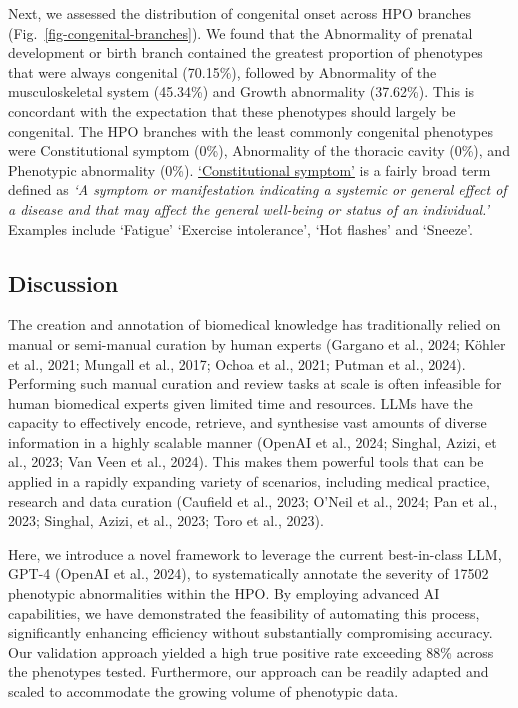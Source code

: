 \documentclass[
]{agujournal2019}
\begin{document}
Next, we assessed the distribution of congenital onset across HPO
branches (Fig.~\ref{fig-congenital-branches}). We found that the
Abnormality of prenatal development or birth branch contained the
greatest proportion of phenotypes that were always congenital (70.15\%),
followed by Abnormality of the musculoskeletal system (45.34\%) and
Growth abnormality (37.62\%). This is concordant with the expectation
that these phenotypes should largely be congenital. The HPO branches
with the least commonly congenital phenotypes were Constitutional
symptom (0\%), Abnormality of the thoracic cavity (0\%), and Phenotypic
abnormality (0\%).
\href{https://hpo.jax.org/app/browse/term/HP:0025142}{`Constitutional
symptom'} is a fairly broad term defined as \emph{`A symptom or
manifestation indicating a systemic or general effect of a disease and
that may affect the general well-being or status of an individual.'}
Examples include `Fatigue' `Exercise intolerance', `Hot flashes' and
`Sneeze'.

\subsection{Discussion}\label{discussion}

The creation and annotation of biomedical knowledge has traditionally
relied on manual or semi-manual curation by human experts (Gargano et
al., 2024; Köhler et al., 2021; Mungall et al., 2017; Ochoa et al.,
2021; Putman et al., 2024). Performing such manual curation and review
tasks at scale is often infeasible for human biomedical experts given
limited time and resources. LLMs have the capacity to effectively
encode, retrieve, and synthesise vast amounts of diverse information in
a highly scalable manner (OpenAI et al., 2024; Singhal, Azizi, et al.,
2023; Van Veen et al., 2024). This makes them powerful tools that can be
applied in a rapidly expanding variety of scenarios, including medical
practice, research and data curation (Caufield et al., 2023; O'Neil et
al., 2024; Pan et al., 2023; Singhal, Azizi, et al., 2023; Toro et al.,
2023).

Here, we introduce a novel framework to leverage the current
best-in-class LLM, GPT-4 (OpenAI et al., 2024), to systematically
annotate the severity of 17502 phenotypic abnormalities within the HPO.
By employing advanced AI capabilities, we have demonstrated the
feasibility of automating this process, significantly enhancing
efficiency without substantially compromising accuracy. Our validation
approach yielded a high true positive rate exceeding 88\% across the
phenotypes tested. Furthermore, our approach can be readily adapted and
scaled to accommodate the growing volume of phenotypic data.
\end{document}
